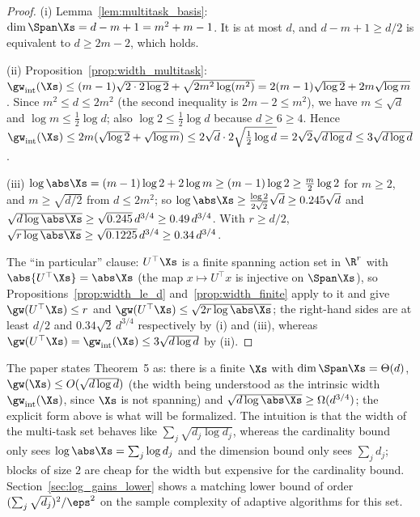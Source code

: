 \begin{proof}
\leanok
{}
(i) Lemma~\ref{lem:multitask_basis}: $\dim\Span\Xs = d - m + 1 = m^2 + m - 1$. It is at most
$d$, and $d - m + 1 \ge d/2$ is equivalent to $d \ge 2m - 2$, which holds.

(ii) Proposition~\ref{prop:width_multitask}:
$\gw_{\mathrm{int}}(\Xs) \le (m-1)\sqrt{2\cdot 2\log 2} + \sqrt{2m^2\log(m^2)} = 2(m-1)\sqrt{\log2} + 2m\sqrt{\log m}$.
Since $m^2 \le d \le 2m^2$ (the second inequality is $2m - 2 \le m^2$), we have
$m \le \sqrt d$ and $\log m \le \frac12\log d$; also $\log 2 \le \frac12\log d$ because
$d \ge 6 \ge 4$. Hence
$\gw_{\mathrm{int}}(\Xs) \le 2m(\sqrt{\log 2} + \sqrt{\log m}) \le 2\sqrt d\cdot 2\sqrt{\tfrac12\log d}
= 2\sqrt2\sqrt{d\log d} \le 3\sqrt{d\log d}$.

(iii) $\log\abs\Xs = (m-1)\log 2 + 2\log m \ge (m-1)\log2 \ge \frac{m}{2}\log 2$ for
$m\ge2$, and $m \ge \sqrt{d/2}$ from $d \le 2m^2$; so
$\log\abs\Xs \ge \frac{\log 2}{2\sqrt2}\sqrt d \ge 0.245\sqrt d$ and
$\sqrt{d\log\abs\Xs} \ge \sqrt{0.245}\,d^{3/4} \ge 0.49\,d^{3/4}$. With $r \ge d/2$,
$\sqrt{r\log\abs\Xs} \ge \sqrt{0.1225}\,d^{3/4} \ge 0.34\,d^{3/4}$.

The ``in particular'' clause: $U^\top\Xs$ is a finite spanning action set in $\R^r$ with
$\abs{U^\top\Xs} = \abs\Xs$ (the map $x \mapsto U^\top x$ is injective on $\Span\Xs$), so
Propositions~\ref{prop:width_le_d} and~\ref{prop:width_finite} apply to it and give
$\gw(U^\top\Xs) \le r$ and $\gw(U^\top\Xs) \le \sqrt{2r\log\abs\Xs}$; the right-hand sides are
at least $d/2$ and $0.34\sqrt2\,d^{3/4}$ respectively by (i) and (iii), whereas
$\gw(U^\top\Xs) = \gw_{\mathrm{int}}(\Xs) \le 3\sqrt{d\log d}$ by (ii).
\end{proof}

\begin{remark}
The paper states Theorem~5 as: there is a finite $\Xs$ with $\dim\Span\Xs = \Theta(d)$,
$\gw(\Xs) \le O(\sqrt{d\log d})$ (the width being understood as the intrinsic width
$\gw_{\mathrm{int}}(\Xs)$, since $\Xs$ is not spanning) and
$\sqrt{d\log\abs\Xs} \ge \Omega(d^{3/4})$; the
explicit form above is what will be formalized. The intuition is that the width of the
multi-task set behaves like $\sum_j\sqrt{d_j\log d_j}$, whereas the cardinality bound only
sees $\log\abs\Xs = \sum_j\log d_j$ and the dimension bound only sees $\sum_j d_j$; blocks of
size $2$ are cheap for the width but expensive for the cardinality bound. Section~\ref{sec:log_gains_lower}
shows a matching lower bound of order $(\sum_j\sqrt{d_j})^2/\eps^2$ on the sample complexity
of adaptive algorithms for this set.
\end{remark}
